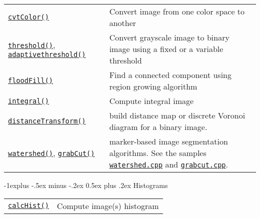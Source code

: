 \documentclass[10pt,landscape]{article}
\makeatletter
\renewcommand{\subsection}{\@startsection{subsection}{2}{0mm}%
                                {-1explus -.5ex minus -.2ex}%
                                {0.5ex plus .2ex}%
                                {\normalfont\normalsize\bfseries}}
\makeatother
\begin{document}
\begin{multicols}{3}
\begin{tabular}{@{}p{\the\MyLen}%
                @{}p{\linewidth-\the\MyLen}@{}}
\texttt{\href{http://opencv.willowgarage.com/documentation/cpp/miscellaneous_image_transformations.html\#cvtColor}{cvtColor()}} & Convert image from one color space to another \\

\texttt{\href{http://opencv.willowgarage.com/documentation/cpp/miscellaneous_image_transformations.html\#threshold}{threshold()}}, \texttt{\href{http://opencv.willowgarage.com/documentation/cpp/miscellaneous_image_transformations.html\#adaptivethreshold}{adaptivethreshold()}} & Convert grayscale image to binary image using a fixed or a variable threshold \\

\texttt{\href{http://opencv.willowgarage.com/documentation/cpp/miscellaneous_image_transformations.html\#floodfill}{floodFill()}} & Find a connected component using region growing algorithm\\

\texttt{\href{http://opencv.willowgarage.com/documentation/cpp/miscellaneous_image_transformations.html\#floodfill}{integral()}} & Compute integral image \\

\texttt{\href{http://opencv.willowgarage.com/documentation/cpp/miscellaneous_image_transformations.html\#distancetransform}{distanceTransform()}}
 & build distance map or discrete Voronoi diagram for a binary image. \\

\texttt{\href{http://opencv.willowgarage.com/documentation/cpp/miscellaneous_image_transformations.html\#floodfill}{watershed()}},
\texttt{\href{http://opencv.willowgarage.com/documentation/cpp/miscellaneous_image_transformations.html\#grabcut}{grabCut()}}
 & marker-based image segmentation algorithms.
 See the samples \texttt{\href{https://code.ros.org/svn/opencv/trunk/opencv/samples/c/watershed.cpp}{watershed.cpp}} and \texttt{\href{https://code.ros.org/svn/opencv/trunk/opencv/samples/c/grabcut.c}{grabcut.cpp}}.

\end{tabular}

\subsection{Histograms}

\begin{tabular}{@{}p{\the\MyLen}%
                @{}p{\linewidth-\the\MyLen}@{}}

\texttt{\href{http://opencv.willowgarage.com/documentation/cpp/histograms.html\#calchist}{calcHist()}} & Compute image(s) histogram \\


\end{tabular}
\end{multicols}
\end{document}
